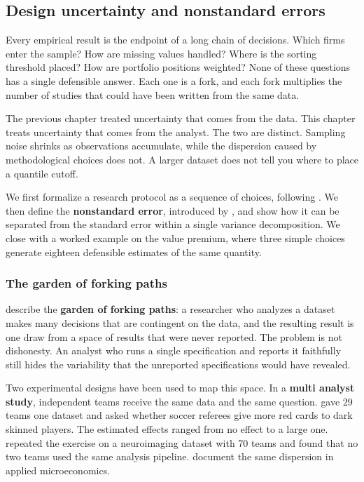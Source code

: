 \subsection{Design uncertainty and nonstandard errors}

Every empirical result is the endpoint of a long chain of decisions. Which firms enter the sample? How are missing values handled? Where is the sorting threshold placed? How are portfolio positions weighted? None of these questions has a single defensible answer. Each one is a fork, and each fork multiplies the number of studies that could have been written from the same data.

The previous chapter treated uncertainty that comes from the data. This chapter treats uncertainty that comes from the analyst. The two are distinct. Sampling noise shrinks as observations accumulate, while the dispersion caused by methodological choices does not. A larger dataset does not tell you where to place a quantile cutoff.

We first formalize a research protocol as a sequence of choices, following \cite{coqueret2026persistent}. We then define the \textbf{nonstandard error}, introduced by \cite{menkveld2021standard}, and show how it can be separated from the standard error within a single variance decomposition. We close with a worked example on the value premium, where three simple choices generate eighteen defensible estimates of the same quantity.

\subsubsection{The garden of forking paths}\label{sec_design_forks}

\cite{gelman2014statistical} describe the \textbf{garden of forking paths}: a researcher who analyzes a dataset makes many decisions that are contingent on the data, and the resulting result is one draw from a space of results that were never reported. The problem is not dishonesty. An analyst who runs a single specification and reports it faithfully still hides the variability that the unreported specifications would have revealed.

Two experimental designs have been used to map this space. In a \textbf{multi analyst study}, independent teams receive the same data and the same question. \cite{silberzahn2018many} gave 29 teams one dataset and asked whether soccer referees give more red cards to dark skinned players. The estimated effects ranged from no effect to a large one. \cite{botviniknezer2020} repeated the exercise on a neuroimaging dataset with 70 teams and found that no two teams used the same analysis pipeline. \cite{huntington2021influence} document the same dispersion in applied microeconomics.

